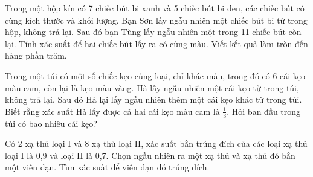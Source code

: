 \begin{ex}%
    Trong một hộp kín có 7 chiếc bút bi xanh và 5 chiếc bút bi đen, các chiếc bút có cùng kích thước và khối lượng. Bạn Sơn lấy ngẫu nhiên một chiếc bút bi từ trong hộp, không trả lại. Sau đó bạn Tùng lấy ngẫu nhiên một trong 11 chiếc bút còn lại. Tính xác suất để hai chiếc bút lấy ra có cùng màu. Viết kết quả làm tròn đến hàng phần trăm.
\end{ex}
\begin{ex}%
    Trong một túi có một số chiếc kẹo cùng loại, chỉ khác màu, trong đó có 6 cái kẹo màu cam, còn lại là kẹo màu vàng. Hà lấy ngẫu nhiên một cái kẹo từ trong túi, không trả lại. Sau đó Hà lại lấy ngẫu nhiên thêm một cái kẹo khác từ trong túi. Biết rằng xác suất Hà lấy được cả hai cái kẹo màu cam là $\frac{1}{3}$. Hỏi ban đầu trong túi có bao nhiêu cái kẹo?
\end{ex}
\begin{ex}%
    Có 2 xạ thủ loại I và 8 xạ thủ loại II, xác suất bắn trúng đích của các loại xạ thủ loại I là 0,9 và loại II là 0,7. Chọn ngẫu nhiên ra một xạ thủ và xạ thủ đó bắn một viên đạn. Tìm xác suất để viên đạn đó trúng đích.
\end{ex}
